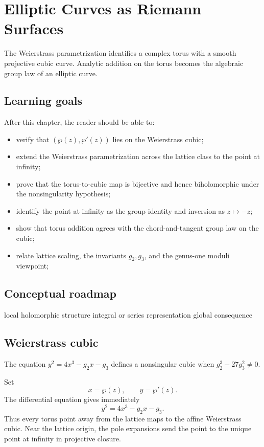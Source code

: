 \chapter{Elliptic Curves as Riemann Surfaces}
\label{ch:iv31}

The Weierstrass parametrization identifies a complex torus with a smooth projective cubic curve. Analytic addition on the torus becomes the algebraic group law of an elliptic curve.

\section*{Learning goals}
After this chapter, the reader should be able to:
\begin{itemize}
\item verify that \((\wp(z),\wp'(z))\) lies on the Weierstrass cubic;
\item extend the Weierstrass parametrization across the lattice class to the point at infinity;
\item prove that the torus-to-cubic map is bijective and hence biholomorphic under the nonsingularity hypothesis;
\item identify the point at infinity as the group identity and inversion as \(z\mapsto -z\);
\item show that torus addition agrees with the chord-and-tangent group law on the cubic;
\item relate lattice scaling, the invariants \(g_2,g_3\), and the genus-one moduli viewpoint;
\end{itemize}
\section*{Conceptual roadmap}
\volroadmap
  {local holomorphic structure}
  {integral or series representation}
  {global consequence}

\section{Weierstrass cubic}
The equation $y^2=4x^3-g_2x-g_3$ defines a nonsingular cubic when $g_2^3-27g_3^2\ne0$.

\begin{example}\label{ex:iv31-expand-01}
Set
\[
x=\wp(z),\qquad y=\wp'(z).
\]
The differential equation gives immediately
\[
y^2=4x^3-g_2x-g_3.
\]
Thus every torus point away from the lattice maps to the affine Weierstrass cubic. Near the lattice origin, the pole expansions send the point to the unique point at infinity in projective closure.
\end{example}

